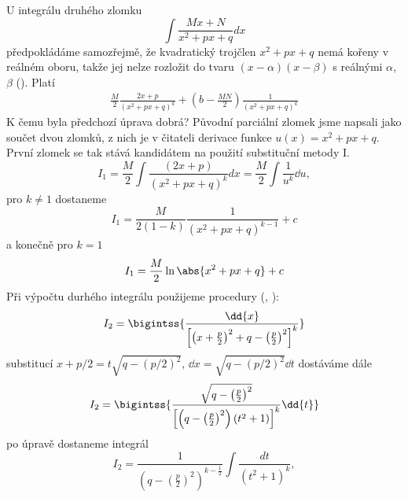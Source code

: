        U integrálu druhého zlomku 
       \begin{equation}\label{mai:eq137}
        \boxed{\int{\frac{Mx + N}{x^2+px+q}dx}}
      \end{equation} 
       předpokládáme samozřejmě, že kvadratický trojčlen \(x^2+px+q\) nemá kořeny v reálném oboru,
       takže jej nelze rozložit do tvaru \((x - \alpha)(x - \beta)\) s reálnými \(\alpha\),
       \(\beta\) (\cite[p.~140]{Musilova2009MA1}). Platí 
      \begin{gather*}
        \frac{M}{2}\frac{2x + p}{(x^2+px+q)^k} + \left(b - \frac{MN}{2}\right)\frac{1}{(x^2+px+q)^k}
      \end{gather*} 
      K čemu byla předchozí úprava dobrá? Původní parciální zlomek jsme napsali jako součet dvou
      zlomků, z nich je v čitateli derivace funkce \(u(x)=x^2+px+q\). První zlomek se tak stává
      kandidátem na použití substituční metody I.
      \begin{equation*}
        I_1 = \frac{M}{2}\int{\frac{(2x + p)}{(x^2+px+q)^k}dx} = \frac{M}{2}\int\frac{1}{u^k}\dd{u},                   
      \end{equation*}  
      pro \(k\neq1\) dostaneme
      \begin{equation*}
        I_1 = \dfrac{M}{2(1-k)}\dfrac{1}{(x^2+px+q)^{k-1}} + c
      \end{equation*}
      a konečně pro \(k=1\)
      \begin{equation*}
        I_1 = \frac{M}{2}\ln\abs{x^2+px+q} + c
      \end{equation*}
      Při výpočtu durhého integrálu použijeme procedury 
      (\cite[p.~407]{Rektorys1963}, \cite[s.~264]{Brabec1989}):
      \begin{equation}\label{MA:int_ex_10}
        I_2 =\bigintss{%
                \dfrac{\dd{x}}
                  {\left[\left(x+\frac{p}{2}\right)^2 + q - \left(\frac{p}{2}\right)^2\right]^k}
             }
      \end{equation}
      substitucí $x + p/2 = t\sqrt{q - (p/2)^2}$, \(\dd{x} = \sqrt{q - (p/2)^2}\dd{t}\)
      dostáváme dále
      \begin{gather*}\label{MA:int_ex_11}
        I_2 = \bigintss{%
                \frac{\sqrt{q-\left(\frac{p}{2}\right)^2}}
                    {\left[\left(q-\left(\frac{p}{2}\right)^2\right)(t^2+1)\right]^k}\dd{t}   
        }  
      \end{gather*}
      po úpravě dostaneme integrál 
      \begin{equation*}
        I_2 = 
          \frac{1}{\left(q-\left(\frac{p}{2}\right)^2\right)^{k-\frac{1}{2}}}
          \int{\frac{dt}{\left(t^2+1\right)^k}},
      \end{equation*}

